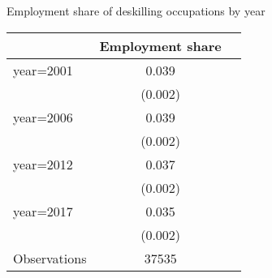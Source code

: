\begin{center}
\begin{threeparttable}[!h]
\caption{Employment share of deskilling occupations by year}
\begin{tabular}{lcc}
\toprule
\toprule
\textbf{}&\multicolumn{1}{c}{\textbf{Employment share}}&\multicolumn{1}{c}{\textbf{ }} \\
\midrule
year=2001           &       0.039\\
                    &     (0.002)\\
year=2006           &       0.039\\
                    &     (0.002)\\
year=2012           &       0.037\\
                    &     (0.002)\\
year=2017           &       0.035\\
                    &     (0.002)\\
Observations        &       37535\\
\bottomrule
\bottomrule
\end{tabular}
\end{threeparttable}
\end{center}
